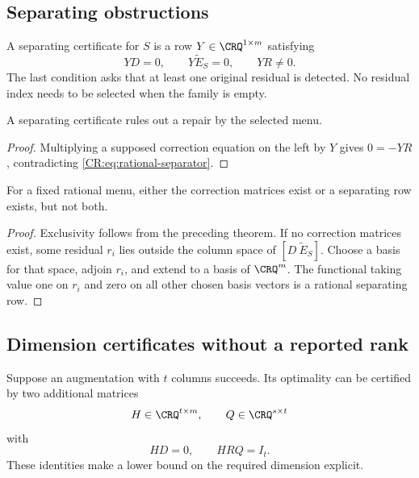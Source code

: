 \subsection{Separating obstructions}
\begin{CRdefinition}
A separating certificate for $S$ is a row $Y\in\CRQ^{1\times m}$ satisfying
\begin{equation}\label{CR:eq:rational-separator}
 YD=0,\qquad Y\widetilde E_S=0,\qquad YR\ne0.
\end{equation}
The last condition asks that at least one original residual is detected. No residual index needs to be selected when the family is empty.
\end{CRdefinition}

\begin{CRtheorem}\label{CR:thm:rational-separation}
A separating certificate rules out a repair by the selected menu.
\end{CRtheorem}
\begin{proof}
Multiplying a supposed correction equation on the left by $Y$ gives $0=-YR$, contradicting \eqref{CR:eq:rational-separator}.
\end{proof}

\begin{CRproposition}\label{CR:prop:rational-alternative}
For a fixed rational menu, either the correction matrices exist or a separating row exists, but not both.
\end{CRproposition}
\begin{proof}
Exclusivity follows from the preceding theorem. If no correction matrices exist, some residual $r_i$ lies outside the column space of $[D\ \widetilde E_S]$. Choose a basis for that space, adjoin $r_i$, and extend to a basis of $\CRQ^m$. The functional taking value one on $r_i$ and zero on all other chosen basis vectors is a rational separating row.
\end{proof}

\subsection{Dimension certificates without a reported rank}
Suppose an augmentation with $t$ columns succeeds. Its optimality can be certified by two additional matrices
\[
 H\in\CRQ^{t\times m},\qquad Q\in\CRQ^{s\times t}
\]
with
\begin{equation}\label{CR:eq:rational-dimension}
 HD=0,\qquad HRQ=I_t.
\end{equation}
These identities make a lower bound on the required dimension explicit.

